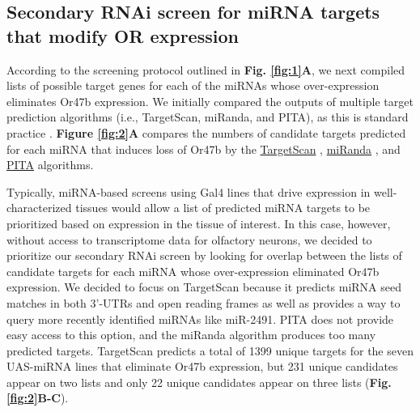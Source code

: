 \subsection*{Secondary RNAi screen for miRNA targets that modify OR expression}

According to the screening protocol outlined in \textbf{Fig.
\ref{fig:1}A}, we next compiled lists of possible target genes for each of the miRNAs whose over-expression eliminates Or47b expression.
We initially compared the outputs of multiple target prediction algorithms (i.e., TargetScan, miRanda, and PITA), as this is standard practice \cite{am_Namkoong_Lee_Chung_Kim_2009,agen_Okamura_Perrimon_Lai_2007}.
\textbf{Figure \ref{fig:2}A} compares the numbers of candidate targets predicted for each miRNA that induces loss of Or47b by the \href{http://www.targetscan.org/fly_12/}{TargetScan} \cite{ohnston_Kellis_Bartel_Lai_2007}, \href{http://www.microrna.org}{miRanda} \cite{Gaul_Tuschl_Sander_Marks_2003}, and \href{http://genie.weizmann.ac.il/pubs/mir07/mir07_dyn_data.html}{PITA} \cite{ino_Unnerstall_Gaul_Segal_2007} algorithms.

Typically, miRNA-based screens using Gal4 lines that drive expression in well-characterized tissues would allow a list of predicted miRNA targets to be prioritized based on expression in the tissue of interest.
In this case, however, without access to transcriptome data for olfactory neurons, we decided to prioritize our secondary RNAi screen by looking for overlap between the lists of candidate targets for each miRNA whose over-expression eliminated Or47b expression.
We decided to focus on TargetScan because it predicts miRNA seed matches in both 3'-UTRs and open reading frames as well as provides a way to query more recently identified miRNAs like miR-2491.
PITA does not provide easy access to this option, and the miRanda algorithm produces too many predicted targets.
TargetScan predicts a total of 1399 unique targets for the seven UAS-miRNA lines that eliminate Or47b expression, but 231 unique candidates appear on two lists and only 22 unique candidates appear on three lists (\textbf{Fig.
\ref{fig:2}B-C}).

